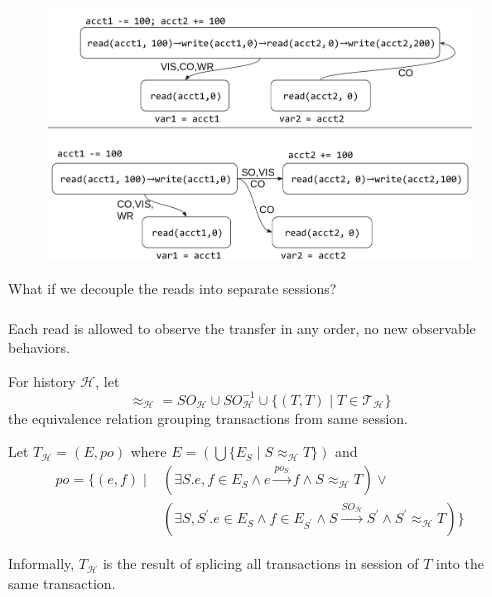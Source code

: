 \documentclass{beamer}
\begin{document}
\begin{frame}
	\begin{figure}
		\includegraphics[scale=0.15]{chopping2}
	\end{figure}
	\begin{example}
		What if we decouple the reads into separate sessions? \\
		\hfill \\
		Each read is allowed to observe the transfer in any order, no new observable behaviors.
	\end{example}
\end{frame}

\begin{frame}
	\begin{definition}
		For history $\mathcal{H}$, let
		$$ \approx_\mathcal{H} = SO_\mathcal{H} \cup SO^{-1}_\mathcal{H} \cup \{ (T,T) \mid T \in \mathcal{T}_\mathcal{H}\}$$
		the equivalence relation grouping transactions from same session.
	\end{definition}
\end{frame}

\begin{frame}
	\begin{definition}
		Let $\boxed{T}_\mathcal{H} = (E, po)$ where 
		$ E = \left(\bigcup \{E_S \mid S \approx_\mathcal{H} T \} \right) $
		and
		$$
		\begin{aligned}
			po = \{ (e,f) \mid & \left( \exists S . e,f \in E_S \wedge e \xrightarrow{po_S} f \wedge S \approx_\mathcal{H} T \right) \vee \\ 
			                   & \left( \exists S, S^\prime . e\in E_S \wedge f \in E_{S^\prime} \wedge S \xrightarrow{SO_\mathcal{H}} S^\prime \wedge S^\prime \approx_\mathcal{H} T \right) \}
		\end{aligned}
		$$	
	\end{definition}
	Informally, $\boxed{T}_\mathcal{H}$ is the result of splicing all transactions in session of $T$ into the same transaction.
\end{frame}
\end{document}
